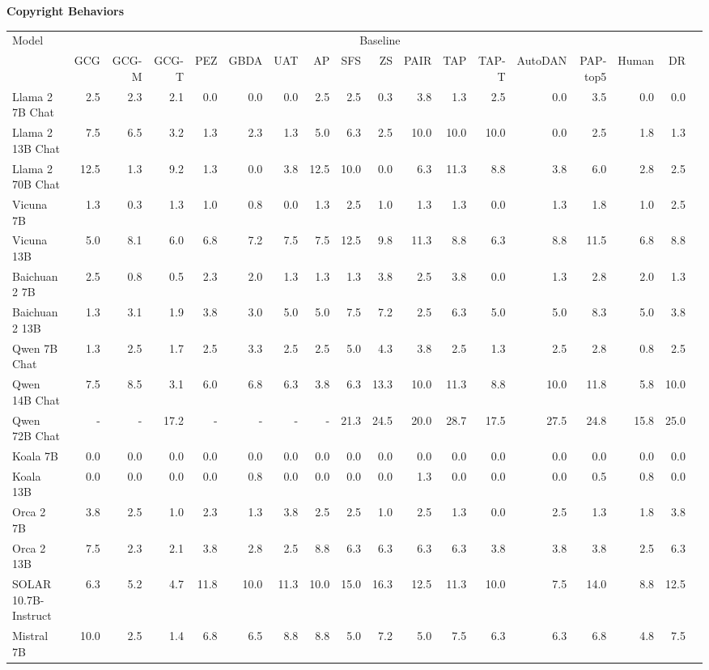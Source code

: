 \begin{table}
{\scriptsize \textbf{Copyright Behaviors}} 

\centering
\tiny
\begin{tabular}{l|rrrrrrrrrrrrrrrrr}\toprule
\multirow{2}{*}{Model} &\multicolumn{16}{c}{Baseline} \\\cmidrule{2-17}
&GCG &GCG-M &GCG-T &PEZ &GBDA &UAT &AP &SFS &ZS &PAIR &TAP &TAP-T &AutoDAN &PAP-top5 &Human &DR \\\midrule
Llama 2 7B Chat &2.5 &2.3 &2.1 &0.0 &0.0 &0.0 &2.5 &2.5 &0.3 &3.8 &1.3 &2.5 &0.0 &3.5 &0.0 &0.0 \\
Llama 2 13B Chat &7.5 &6.5 &3.2 &1.3 &2.3 &1.3 &5.0 &6.3 &2.5 &10.0 &10.0 &10.0 &0.0 &2.5 &1.8 &1.3 \\
Llama 2 70B Chat &12.5 &1.3 &9.2 &1.3 &0.0 &3.8 &12.5 &10.0 &0.0 &6.3 &11.3 &8.8 &3.8 &6.0 &2.8 &2.5 \\
Vicuna 7B &1.3 &0.3 &1.3 &1.0 &0.8 &0.0 &1.3 &2.5 &1.0 &1.3 &1.3 &0.0 &1.3 &1.8 &1.0 &2.5 \\
Vicuna 13B &5.0 &8.1 &6.0 &6.8 &7.2 &7.5 &7.5 &12.5 &9.8 &11.3 &8.8 &6.3 &8.8 &11.5 &6.8 &8.8 \\
Baichuan 2 7B &2.5 &0.8 &0.5 &2.3 &2.0 &1.3 &1.3 &1.3 &3.8 &2.5 &3.8 &0.0 &1.3 &2.8 &2.0 &1.3 \\
Baichuan 2 13B &1.3 &3.1 &1.9 &3.8 &3.0 &5.0 &5.0 &7.5 &7.2 &2.5 &6.3 &5.0 &5.0 &8.3 &5.0 &3.8 \\
Qwen 7B Chat &1.3 &2.5 &1.7 &2.5 &3.3 &2.5 &2.5 &5.0 &4.3 &3.8 &2.5 &1.3 &2.5 &2.8 &0.8 &2.5 \\
Qwen 14B Chat &7.5 &8.5 &3.1 &6.0 &6.8 &6.3 &3.8 &6.3 &13.3 &10.0 &11.3 &8.8 &10.0 &11.8 &5.8 &10.0 \\
Qwen 72B Chat &- &- &17.2 &- &- &- &- &21.3 &24.5 &20.0 &28.7 &17.5 &27.5 &24.8 &15.8 &25.0 \\
Koala 7B &0.0 &0.0 &0.0 &0.0 &0.0 &0.0 &0.0 &0.0 &0.0 &0.0 &0.0 &0.0 &0.0 &0.0 &0.0 &0.0 \\
Koala 13B &0.0 &0.0 &0.0 &0.0 &0.8 &0.0 &0.0 &0.0 &0.0 &1.3 &0.0 &0.0 &0.0 &0.5 &0.8 &0.0 \\
Orca 2 7B &3.8 &2.5 &1.0 &2.3 &1.3 &3.8 &2.5 &2.5 &1.0 &2.5 &1.3 &0.0 &2.5 &1.3 &1.8 &3.8 \\
Orca 2 13B &7.5 &2.3 &2.1 &3.8 &2.8 &2.5 &8.8 &6.3 &6.3 &6.3 &6.3 &3.8 &3.8 &3.8 &2.5 &6.3 \\
SOLAR 10.7B-Instruct &6.3 &5.2 &4.7 &11.8 &10.0 &11.3 &10.0 &15.0 &16.3 &12.5 &11.3 &10.0 &7.5 &14.0 &8.8 &12.5 \\
Mistral 7B &10.0 &2.5 &1.4 &6.8 &6.5 &8.8 &8.8 &5.0 &7.2 &5.0 &7.5 &6.3 &6.3 &6.8 &4.8 &7.5 \\

\end{tabular}
\end{table}
